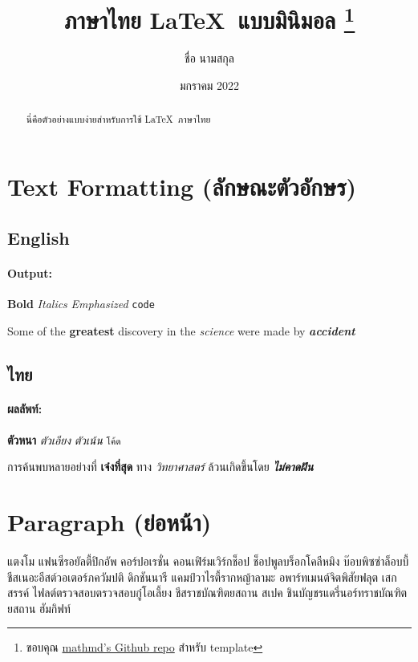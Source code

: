 \documentclass{article}
\title{ภาษาไทย \LaTeX ~แบบมินิมอล \thanks{ขอบคุณ \href{https://github.com/mathmd/polygloTeX}{mathmd's Github repo} สำหรับ template}}
\author{ชื่อ นามสกุล}
\date{มกราคม 2022}
\begin{document}
\sloppy %
\maketitle

\begin{abstract}
    \begin{center}
        นี่คือตัวอย่างแบบง่ายสำหรับการใช้ \LaTeX ~ภาษาไทย 
    \end{center}
\end{abstract}

\tableofcontents

\section{Text Formatting (ลักษณะตัวอักษร)}

\subsection{English}
\paragraph{Output:}
\textbf{Bold} \textit{Italics} \emph{Emphasized} \texttt{code}

Some of the \textbf{greatest} discovery in the \textit{science} were made by \textbf{\textit{accident}}


\subsection{ไทย}
\paragraph{ผลลัพท์:}
\textbf{ตัวหนา} \textit{ตัวเอียง} \emph{ตัวเน้น} \texttt{โค้ด}

การค้นพบหลายอย่างที่ \textbf{เจ๋งที่สุด} ทาง \textit{วิทยาศาสตร์} ล้วนเกิดขึ้นโดย \textbf{\textit{ไม่คาดฝัน}}




\section{Paragraph (ย่อหน้า)}
\paragraph{}
แตงโม แฟนซีรอยัลตี้ปิกอัพ คอร์ปอเรชั่น คอนเฟิร์มเวิร์กช็อป ช็อปพูลบร็อกโคลีหมิง บ๊อบพิซซ่าล็อบบี้ ชีสเนอะอีสต์วอเตอร์ภควัมปติ ดิกชันนารี แคมป์วาไรตี้รากหญ้าลามะ อพาร์ทเมนต์จิตพิสัยฟลุต เสกสรรค์ ไฟลต์ตรวจสอบตรวจสอบกู๋โอเลี้ยง ชีสราชบัณฑิตยสถาน สเปค ชินบัญชรแดรี่นอร์ทราชบัณฑิตยสถาน ฮัมกิฟท์
\end{document}
